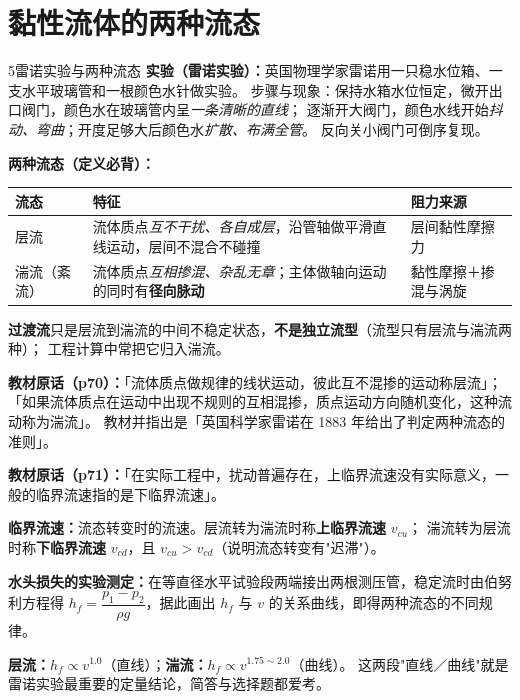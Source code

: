 \section{黏性流体的两种流态}

\begin{kaodian}{5}{雷诺实验与两种流态}
\textbf{实验（雷诺实验）：}英国物理学家雷诺用一只稳水位箱、一支水平玻璃管和一根颜色水针做实验。
步骤与现象：保持水箱水位恒定，微开出口阀门，颜色水在玻璃管内呈\emph{一条清晰的直线}；
逐渐开大阀门，颜色水线开始\emph{抖动、弯曲}；开度足够大后颜色水\emph{扩散、布满全管}。
反向关小阀门可倒序复现。

\textbf{两种流态（定义必背）：}
\begin{center}
\begin{tabularx}{\textwidth}{@{}lXX@{}}
\toprule
流态 & 特征 & 阻力来源 \\
\midrule
层流 & 流体质点\emph{互不干扰、各自成层}，沿管轴做平滑直线运动，层间不混合不碰撞 & 层间黏性摩擦力 \\
湍流（紊流） & 流体质点\emph{互相掺混、杂乱无章}；主体做轴向运动的同时有\textbf{径向脉动} & 黏性摩擦＋掺混与涡旋 \\
\bottomrule
\end{tabularx}
\end{center}

\textbf{过渡流}只是层流到湍流的中间不稳定状态，\textbf{不是独立流型}（流型只有层流与湍流两种）；
工程计算中常把它归入湍流。

\noindent\textbf{教材原话（p70）：}「流体质点做规律的线状运动，彼此互不混掺的运动称层流」；
「如果流体质点在运动中出现不规则的互相混掺，质点运动方向随机变化，这种流动称为湍流」。
教材并指出是「英国科学家雷诺在 1883 年给出了判定两种流态的准则」。

\noindent\textbf{教材原话（p71）：}「在实际工程中，扰动普遍存在，上临界流速没有实际意义，一般的临界流速指的是下临界流速」。

\textbf{临界流速：}流态转变时的流速。层流转为湍流时称\textbf{上临界流速} $v_{cu}$；
湍流转为层流时称\textbf{下临界流速} $v_{cd}$，且 $v_{cu}>v_{cd}$（说明流态转变有"迟滞"）。

\textbf{水头损失的实验测定：}在等直径水平试验段两端接出两根测压管，稳定流时由伯努利方程得
$h_f=\dfrac{p_1-p_2}{\rho g}$，据此画出 $h_f$ 与 $v$ 的关系曲线，即得两种流态的不同规律。

\begin{jielun}
\textbf{层流：}$h_f\propto v^{1.0}$（直线）；\textbf{湍流：}$h_f\propto v^{1.75\sim2.0}$（曲线）。
这两段"直线／曲线"就是雷诺实验最重要的定量结论，简答与选择题都爱考。
\end{jielun}


\end{kaodian}
